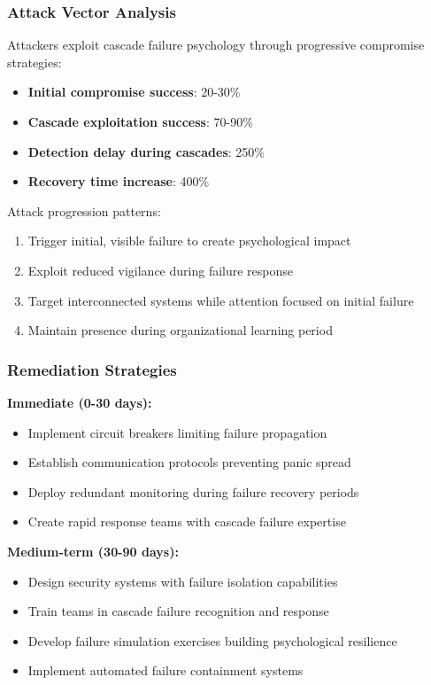 \documentclass[11pt,a4paper]{article}
\begin{document}
\subsubsection{Attack Vector Analysis}

Attackers exploit cascade failure psychology through progressive compromise strategies:

\begin{itemize}
\item \textbf{Initial compromise success}: 20-30\%
\item \textbf{Cascade exploitation success}: 70-90\%
\item \textbf{Detection delay during cascades}: 250\%
\item \textbf{Recovery time increase}: 400\%
\end{itemize}

Attack progression patterns:
\begin{enumerate}
\item Trigger initial, visible failure to create psychological impact
\item Exploit reduced vigilance during failure response
\item Target interconnected systems while attention focused on initial failure
\item Maintain presence during organizational learning period
\end{enumerate}

\subsubsection{Remediation Strategies}

\textbf{Immediate (0-30 days):}
\begin{itemize}
\item Implement circuit breakers limiting failure propagation
\item Establish communication protocols preventing panic spread
\item Deploy redundant monitoring during failure recovery periods
\item Create rapid response teams with cascade failure expertise
\end{itemize}

\textbf{Medium-term (30-90 days):}
\begin{itemize}
\item Design security systems with failure isolation capabilities
\item Train teams in cascade failure recognition and response
\item Develop failure simulation exercises building psychological resilience
\item Implement automated failure containment systems
\end{itemize}
\end{document}
